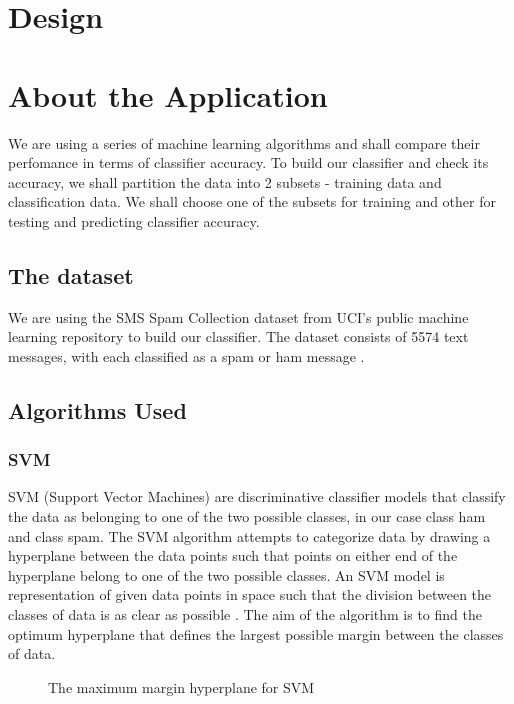 \documentclass[9pt,twocolumn,twoside]{../../styles/osajnl}
\begin{document}
{\section{Design}

\section{About the Application}
We are using a series of machine learning algorithms and shall compare
their perfomance in terms of classifier accuracy. To build our
classifier and check its accuracy, we shall partition the data into 2
subsets - training data and classification data. We shall choose one
of the subsets for training and other for testing and predicting
classifier accuracy.

\subsection{The dataset}
We are using the SMS Spam Collection dataset from UCI's
public machine learning repository to build our classifier. The
dataset consists of 5574 text messages, with each classified as a spam
or ham message \cite{www-sms_spam_collection}.

\subsection{Algorithms Used}

\subsubsection{SVM}
SVM (Support Vector Machines) are discriminative classifier models
that classify the data as belonging to one of the two possible
classes, in our case class ham and class spam. The SVM algorithm
attempts to categorize data by drawing a hyperplane between the data
points such that points on either end of the hyperplane belong to one
of the two possible classes. An SVM model is representation of given
data points in space such that the division between the classes of
data is as clear as possible \cite{www-svm-wiki}. The aim of the algorithm
is to find the optimum hyperplane that defines the largest possible
margin between the classes of data.

\begin{figure}[htbp]
\centering
{}
\caption{The maximum margin hyperplane for SVM \cite{www-svm-tutorial}}
\label{fig:The maximum margin hyperplane for SVM}
\end{figure}

}
\end{document}
